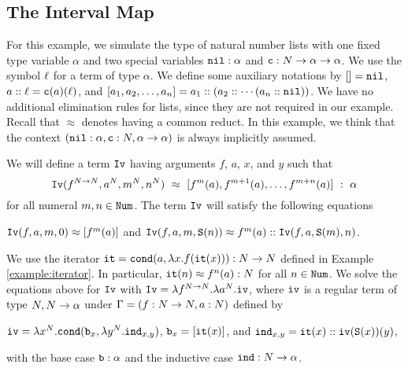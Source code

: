 \subsection{The Interval Map}\label{subsection-interval}

For this example, we simulate the type of natural number lists
with one fixed type variable $\alpha$
and two special variables ${\tt nil}:\alpha$ and ${\tt c}:{N} \rightarrow \alpha \rightarrow \alpha$. 
We use the symbol $\ell$ for a term of type $\alpha$. 
We define some auxiliary notations by $[]={\tt nil}$,
$a::\ell = {\tt c}(a)(\ell)$, and
$[a_1,a_2,\ldots,a_n] = a_1::(a_2::\cdots (a_n::{\tt nil}))$.
We have no additional elimination rules for lists, since 
they are not required in our example.
Recall that $\approx$ denotes having a common reduct.
In this example, we think that the context
$({\tt nil}:\alpha, {\tt c}:{N},\alpha \rightarrow \alpha)$
is always implicitly assumed. 

\begin{example}\label{example:interval}
We will define a term ${\tt Iv}$ having arguments
$f$, $a$, $x$, and $y$ such that 
\[
\Interval(f^{\N\rightarrow\N},a^{\N},m^{\N},n^{\N})\ \approx \ [f^m(a), f^{m+1}(a), \ldots, f^{m+n}(a)] \  : \ \alpha
\]
for all numeral $m,n \in {\tt Num}$.
The term ${\tt Iv}$ will satisfy the following equations
\begin{center}
  ${\tt Iv}(f,a,m,0) \approx [f^m(a)]$
  \quad
  and
  \quad
  ${\tt Iv}(f,a,m,{\tt S}(n))  \approx f^m(a)::{\tt Iv}(f,a,{\tt S}(m),n)$.
\end{center}
We use the iterator ${\tt it} = {\tt cond} (a, \lambda x.f({\tt it}(x))):{N} \rightarrow {N}$ defined in Example \ref{example:iterator}. 
In particular, ${\tt it}(n) \approx f^n(a) : {N}$ for all $n \in {\tt Num}$.
We solve the equations above for ${\tt Iv}$ with 
${\tt Iv} = \lambda f^{{N}\rightarrow{N}}. \lambda a^{N}.{\tt iv}$,
where ${\tt iv}$ is a regular term of type ${N},{N}\rightarrow\alpha$
under $\Gamma = (f:{N}\rightarrow{N},a:{N})$ defined by
\begin{center}
  ${\tt iv} 
  = 
  \lambda x^{N}.{\tt cond} ({\tt b}_x, \lambda y^{N}.{\tt ind}_{x,y})$, 
  \quad
  ${\tt b}_x
  = 
  [{\tt it}(x)]$, 
  \hspace{3ex}
  and
  \hspace{3ex}  
  ${\tt ind}_{x,y}
  = 
  {\tt it}(x) :: {\tt iv}({\tt S}(x))(y)$, 
\end{center}
with the base case ${\tt b}:\alpha$ and the inductive case ${\tt ind}:{N}\rightarrow\alpha$. 
\end{example}


